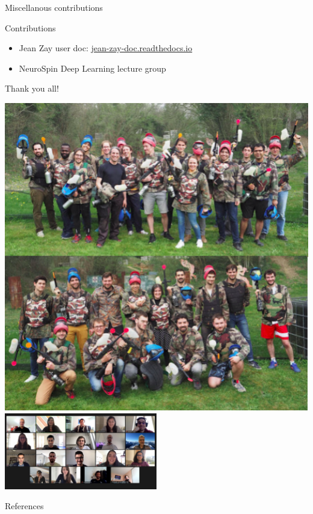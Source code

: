 \documentclass[aspectratio=169,xcolor=dvipsnames]{beamer}
\begin{document}
\begin{frame}{Miscellanous contributions}
    \begin{exampleblock}{Contributions}
        \begin{itemize}
            \item Jean Zay user doc: \href{https://jean-zay-doc.readthedocs.io/}{jean-zay-doc.readthedocs.io}
            \item NeuroSpin Deep Learning lecture group
        \end{itemize}
    \end{exampleblock}
\end{frame}

\begin{frame}{Thank you all!}
    \begin{center}
        \includegraphics[height=0.5\textheight]{Figures/parietal_2019.png}
        \includegraphics[width=0.5\textwidth]{Figures/cosmostat_zoom.jpeg}
    \end{center}
\end{frame}



\begin{frame}[allowframebreaks]{References}
    \printbibliography
\end{frame}
\end{document}
